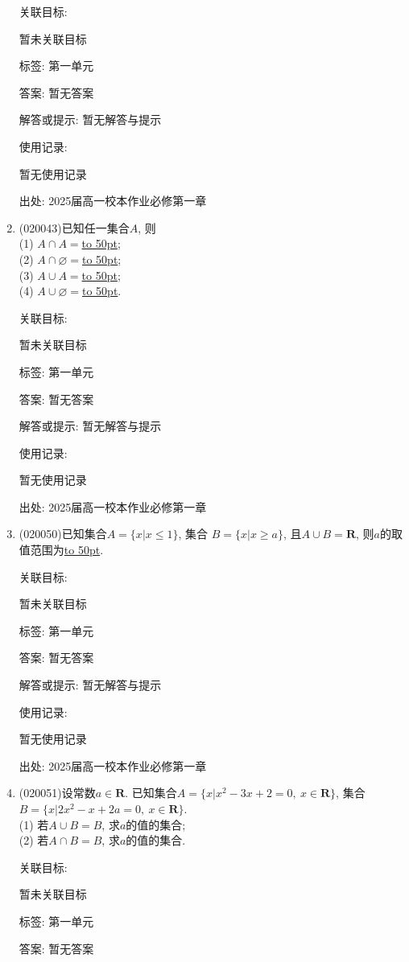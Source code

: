 \documentclass[10pt,a4paper]{article}
\newcommand{\blank}[1]{\underline{\hbox to #1pt{}}}
\begin{document}
\begin{enumerate}[1.]
关联目标:

暂未关联目标



标签: 第一单元

答案: 暂无答案

解答或提示: 暂无解答与提示

使用记录:

暂无使用记录


出处: 2025届高一校本作业必修第一章
\item { (020043)}已知任一集合$A$, 则\\
(1) $A\cap A=$\blank{50};\\
(2) $A\cap\varnothing=$\blank{50};\\
(3) $A\cup A=$\blank{50};\\
(4) $A\cup\varnothing=$\blank{50}.


关联目标:

暂未关联目标



标签: 第一单元

答案: 暂无答案

解答或提示: 暂无解答与提示

使用记录:

暂无使用记录


出处: 2025届高一校本作业必修第一章
\item { (020050)}已知集合$A=\{x| x\le 1\}$, 集合 $B=\{x| x\ge a\}$, 且$A\cup B=\mathbf{R}$, 则$a$的取值范围为\blank{50}.


关联目标:

暂未关联目标



标签: 第一单元

答案: 暂无答案

解答或提示: 暂无解答与提示

使用记录:

暂无使用记录


出处: 2025届高一校本作业必修第一章
\item { (020051)}设常数$a\in \mathbf{R}$. 已知集合$A=\{x|x^2-3x+2=0, \ x\in\mathbf{R}\}$, 集合$B=\{x|2x^2-x+2a=0,\  x\in\mathbf{R}\}$.\\ (1) 若$A\cup B=B$, 求$a$的值的集合;\\
(2) 若$A\cap B=B$, 求$a$的值的集合.


关联目标:

暂未关联目标



标签: 第一单元

答案: 暂无答案


\end{enumerate}
\end{document}
